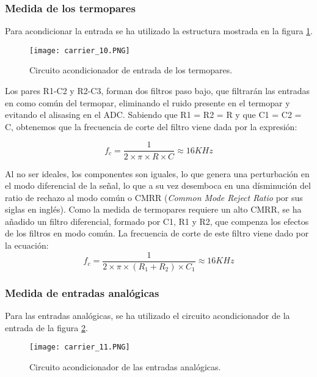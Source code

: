 		\subsubsection{Medida de los termopares}	
	
		Para acondicionar la entrada se ha utilizado la estructura mostrada en la figura \ref{fig:car10}.
	
	\begin{figure}[hbt!]
		\centering
		\texttt{[image: carrier\_10.PNG]}
		\caption{Circuito acondicionador de entrada de los termopares.}
		\label{fig:car10}
	\end{figure}
		
	Los pares R1-C2 y R2-C3, forman dos filtros paso bajo, que filtrarán las entradas en como común del termopar, eliminando el ruido presente en el termopar y evitando el alisasing en el ADC. Sabiendo que R1 = R2 = R y que C1 = C2 = C, obtenemos que la frecuencia de corte del filtro viene dada por la expresión:
	
	\begin{equation}
		f_c = \frac{1}{2\times \pi\times R\times C} \approx 16 KHz
	\end{equation}
	
	Al no ser ideales, los componentes son iguales, lo que genera una perturbación en el modo diferencial de la señal, lo que a su vez desemboca en una dísminución del ratio de rechazo al modo común o CMRR (\textit{Common Mode Reject Ratio} por sus siglas en inglés). Como la medida de termopares requiere un alto CMRR, se ha añadido un filtro diferencial, formado por C1, R1 y R2, que compenza los efectos de los filtros en modo común. La frecuencia de corte de este filtro viene dado por la ecuación:
		\begin{equation}
		f_c = \frac{1}{2\times \pi\times (R_1 + R_2)\times C_1} \approx 16 KHz
	\end{equation}
	
	
		\subsubsection{Medida de entradas analógicas}

Para las entradas analógicas, se ha utilizado el circuito acondicionador de la entrada de la figura \ref{fig:car11}.

\begin{figure}[hbt!]
	\centering
	\texttt{[image: carrier\_11.PNG]}
	\caption{Circuito acondicionador de las entradas analógicas.}
	\label{fig:car11}
\end{figure}


